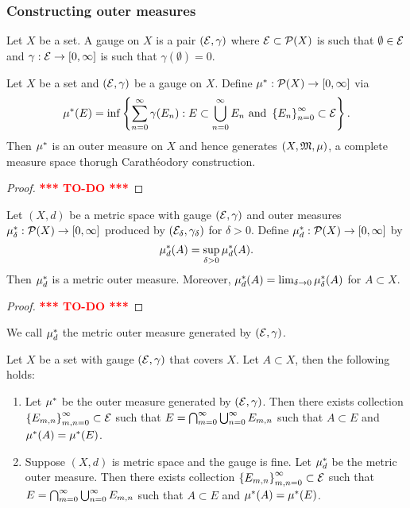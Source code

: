 \documentclass[a4paper]{article}
\newcommand{\TODO}{\textcolor{red}{\textbf{*** TO-DO ***}}}
\begin{document}
\subsubsection{Constructing outer measures}

\begin{defi}
  Let $X$ be a set. A gauge on $X$ is a pair $(\mathcal{E}, \gamma)$
  where $\mathcal{E} \subset \mathcal{P}(X)$ is such that $\emptyset 
  \in \mathcal{E}$ and $\gamma : \mathcal{E} \to [0, \infty]$ 
  is such that $\gamma(\emptyset) = 0$.
\end{defi}

\begin{thm}
  Let $X$ be a set and $(\mathcal{E}, \gamma)$ be a gauge on $X$.
  Define $\mu^*: \mathcal{P}(X) \to [0, \infty]$ via 
  \[
  \mu^*(E) = \inf \left\{ \sum_{n=0}^\infty \gamma(E_n): 
  E \subset \bigcup_{n=0}^\infty E_n \text{ and } 
  \left\{ E_n \right\}_{n=0}^\infty \subset \mathcal{E} \right\}.
  \]
  Then $\mu^*$ is an outer measure on $X$ and hence 
  generates $(X, \mathfrak{M}, \mu)$, a complete measure space 
  thorugh Carath\'eodory construction.
\end{thm}

\begin{proof}
  \TODO
\end{proof}

\begin{thm}
  Let $(X, d)$ be a metric space with gauge $(\mathcal{E}, \gamma)$
  and outer measures $\mu^*_\delta: \mathcal{P}(X) \to [0, \infty]$
  produced by $(\mathcal{E}_\delta, \gamma_\delta)$ for $\delta > 0$.
  Define $\mu^*_d : \mathcal{P}(X) \to [0, \infty]$ by 
  \[
  \mu^*_d(A) = \sup_{\delta > 0} \mu^*_d (A).
  \]
  Then $\mu^*_d$ is a metric outer measure. Moreover, 
  $\mu^*_d(A) = \lim_{\delta \to 0} \mu^*_\delta(A)$ 
  for $A \subset X$.
\end{thm}

\begin{proof}
  \TODO
\end{proof}

\begin{defi}
  We call $\mu^*_d$ the metric outer measure generated 
  by $(\mathcal{E}, \gamma)$.
\end{defi}

\begin{lemma}
  Let $X$ be a set with gauge $(\mathcal{E}, \gamma)$ that covers 
  $X$. Let $A \subset X$, then the following holds:
  \begin{enumerate}
    \item Let $\mu^*$ be the outer measure generated 
    by $(\mathcal{E}, \gamma)$. Then there exists collection 
    $\left\{ E_{m,n} \right\}_{m, n= 0}^\infty \subset \mathcal{E}$
    such that $E = \bigcap_{m=0}^\infty \bigcup_{n=0}^\infty E_{m, n}$ such that 
    $A \subset E$ and $\mu^*(A) = \mu^*(E)$. 

    \item Suppose $(X, d)$ is metric space and the gauge is 
    fine.
    Let $\mu^*_d$ be the metric outer measure. Then there exists collection 
    $\left\{ E_{m,n} \right\}_{m, n= 0}^\infty \subset \mathcal{E}$
    such that $E = \bigcap_{m=0}^\infty \bigcup_{n=0}^\infty E_{m, n}$ such that 
    $A \subset E$ and $\mu^*(A) = \mu^*(E)$. 
  \end{enumerate}
\end{lemma}
\end{document}
